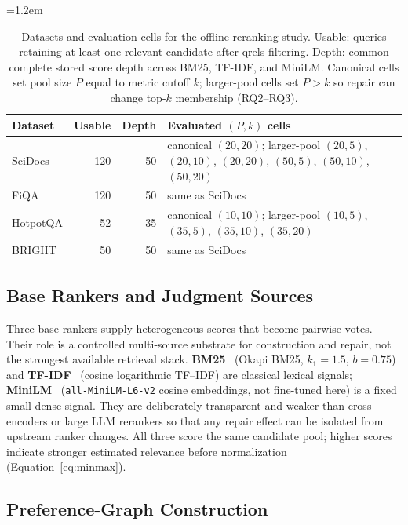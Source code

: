 \documentclass[pdflatex,sn-basic,Numbered]{sn-jnl}
\newcommand{\sncstable}{%
  \footnotesize
  \renewcommand{\arraystretch}{1.28}%
  \setlength{\tabcolsep}{3.8pt}%
  \tolerance=2000%
  \emergencystretch=1.2em%
  \hyphenpenalty=200\exhyphenpenalty=200\relax
}
\begin{document}
\begin{table}[t]
  \caption{Datasets and evaluation cells for the offline reranking study.
    Usable: queries retaining at least one relevant candidate after qrels
    filtering. Depth: common complete stored score depth across BM25,
    TF-IDF, and MiniLM. Canonical cells set pool size $P$ equal to metric
    cutoff $k$; larger-pool cells set $P>k$ so repair can change top-$k$
    membership (RQ2--RQ3).}
  \label{tab:setup}
  \sncstable
  \begin{tabularx}{\linewidth}{@{}lrrY@{}}
    \toprule
    Dataset & Usable & Depth & Evaluated $(P,k)$ cells \\
    \midrule
    SciDocs & 120 & 50 & canonical $(20,20)$; larger-pool $(20,5)$,
      $(20,10)$, $(20,20)$, $(50,5)$, $(50,10)$, $(50,20)$ \\
    \addlinespace
    FiQA & 120 & 50 & same as SciDocs \\
    \addlinespace
    HotpotQA & 52 & 35 & canonical $(10,10)$; larger-pool $(10,5)$,
      $(35,5)$, $(35,10)$, $(35,20)$ \\
    \addlinespace
    BRIGHT & 50 & 50 & same as SciDocs \\
    \bottomrule
  \end{tabularx}
\end{table}

\subsection{Base Rankers and Judgment Sources}
\label{sec:rankers}

Three base rankers supply heterogeneous scores that become pairwise votes.
Their role is a controlled multi-source substrate for construction and
repair, not the strongest available retrieval stack.
\textbf{BM25}~\cite{robertson2009probabilistic} (Okapi BM25, $k_1=1.5$,
$b=0.75$) and \textbf{TF-IDF}~\cite{salton1988termweighting} (cosine
logarithmic TF--IDF) are classical lexical signals;
\textbf{MiniLM}~\cite{wang2020minilm} (\texttt{all-MiniLM-L6-v2} cosine
embeddings, not fine-tuned here) is a fixed small dense signal. They are
deliberately transparent and weaker than cross-encoders or large LLM
rerankers so that any repair effect can be isolated from upstream ranker
changes. All three score the same candidate pool; higher scores indicate
stronger estimated relevance before normalization
(Equation~\eqref{eq:minmax}).

\subsection{Preference-Graph Construction}
\label{sec:construction-protocol}
\end{document}
